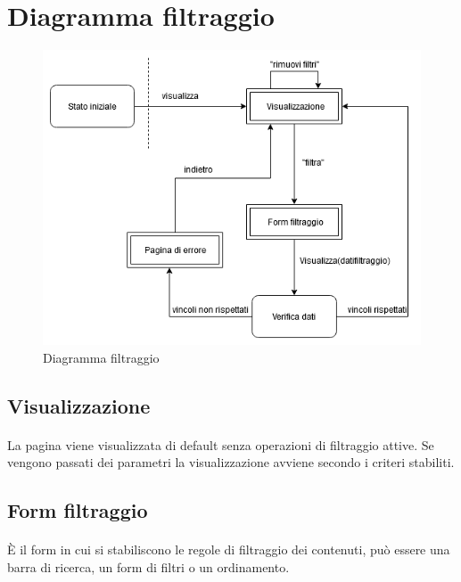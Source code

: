 \documentclass[a4paper, 12pt]{report}
\begin{document}
        \section{Diagramma filtraggio}
            \begin{figure}[ht]
                \centering
                \includegraphics[scale=0.5]{Immagini/FiltraggioDiagramma.png}
                \caption{Diagramma filtraggio}
            \end{figure}
            \subsection{Visualizzazione}
                \paragraph{}La pagina viene visualizzata di default senza operazioni di filtraggio attive. Se vengono passati dei parametri la visualizzazione avviene
                secondo i criteri stabiliti.
            \subsection{Form filtraggio}
                \paragraph{}È il form in cui si stabiliscono le regole di filtraggio dei contenuti, può essere una barra di ricerca, un form di filtri o un ordinamento.
        \clearpage
\end{document}
